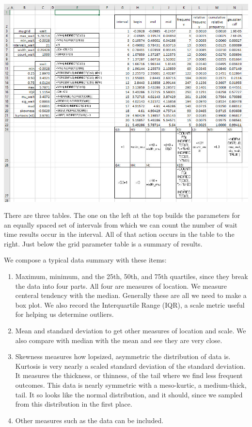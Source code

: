 \documentclass[
]{book}
\begin{document}
\includegraphics{images/05/eatery-eda-calculation.jpg}

There are three tables. The one on the left at the top builds the parameters for an equally spaced set of intervals from which we can count the number of wait time results occur in the interval. All of that action occurs in the table to the right. Just below the grid parameter table is a summary of results.

We compose a typical data summary with these items:

\begin{enumerate}
\def\labelenumi{\arabic{enumi}.}
\item
  Maximum, minimum, and the 25th, 50th, and 75th quartiles, since they break the data into four parts. All four are measures of location. We measure centeral tendency with the median. Generally these are all we need to make a box plot. We also record the Interquartile Range (IQR), a scale metric useful for helping us determine outliers.
\item
  Mean and standard deviation to get other measures of location and scale. We also compare with median with the mean and see they are very close.
\item
  Skewness measures how lopsized, asymmetric the distribution of data is. Kurtosis is very nearly a scaled standard deviation of the standard deviation. It measures the thickness, or thinness, of the tail where we find less frequent outcomes. This data is nearly symmetric with a meso-kurtic, a medium-thick, tail. It so looks like the normal distribution, and it should, since we sampled from this distribution in the first place.
\item
  Other measures such as the data can be included.
\end{enumerate}
\end{document}
